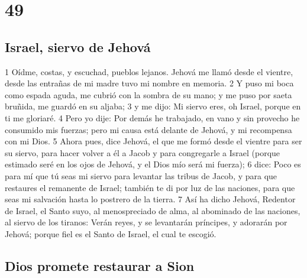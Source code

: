 \chapter{49}

\section*{Israel, siervo de Jehová}

1 Oídme, costas, y escuchad, pueblos lejanos. Jehová me llamó desde el vientre, desde las entrañas de mi madre tuvo mi nombre en memoria.
2 Y puso mi boca como espada aguda, me cubrió con la sombra de su mano; y me puso por saeta bruñida, me guardó en su aljaba;
3 y me dijo: Mi siervo eres, oh Israel, porque en ti me gloriaré.
4 Pero yo dije: Por demás he trabajado, en vano y sin provecho he consumido mis fuerzas; pero mi causa está delante de Jehová, y mi recompensa con mi Dios.
5 Ahora pues, dice Jehová, el que me formó desde el vientre para ser su siervo, para hacer volver a él a Jacob y para congregarle a Israel (porque estimado seré en los ojos de Jehová, y el Dios mío será mi fuerza);
6 dice: Poco es para mí que tú seas mi siervo para levantar las tribus de Jacob, y para que restaures el remanente de Israel; también te di por luz de las naciones, para que seas mi salvación hasta lo postrero de la tierra. 
7 Así ha dicho Jehová, Redentor de Israel, el Santo suyo, al menospreciado de alma, al abominado de las naciones, al siervo de los tiranos: Verán reyes, y se levantarán príncipes, y adorarán por Jehová; porque fiel es el Santo de Israel, el cual te escogió.

\section*{Dios promete restaurar a Sion}

